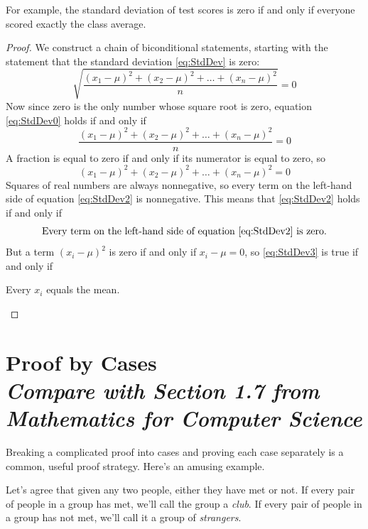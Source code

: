 \documentclass[11pt,oneside]{book}
\theoremstyle{definition}
\begin{document}
For example, the standard deviation of test scores is zero if and only if everyone scored exactly the class average.
\begin{proof}
    We construct a chain of biconditional statements, starting with the statement that the standard deviation \eqref{eq:StdDev} is zero:
    \begin{equation}
        \sqrt{\frac{(x_{1} - \mu)^{2} + (x_{2} - \mu)^{2} + \dots + (x_{n} - \mu)^{2}}{n}} = 0 \label{eq:StdDev0}
    \end{equation}
    Now since zero is the only number whose square root is zero, equation \eqref{eq:StdDev0} holds if and only if
    \begin{equation}
        \frac{(x_{1} - \mu)^{2} + (x_{2} - \mu)^{2} + \dots + (x_{n} - \mu)^{2}}{n} = 0 \label{eq:StdDev1}
    \end{equation}
    A fraction is equal to zero if and only if its numerator is equal to zero, so
    \begin{equation}
        (x_{1} - \mu)^{2} + (x_{2} - \mu)^{2} + \dots + (x_{n} - \mu)^{2} = 0 \label{eq:StdDev2}
    \end{equation}
    Squares of real numbers are always nonnegative, so every term on the left-hand side of equation \eqref{eq:StdDev2} is nonnegative.
    This means that \eqref{eq:StdDev2} holds if and only if
    \begin{equation}
        \text{Every term on the left-hand side of equation \eqref{eq:StdDev2} is zero.} \label{eq:StdDev3}
    \end{equation}
    But a term $(x_{i} - \mu)^{2}$ is zero if and only if $x_{i} - \mu = 0$, so \eqref{eq:StdDev3} is true if and only if
    \begin{center}
        Every $x_{i}$ equals the mean.
    \end{center}
\end{proof}


\section[Proof by Cases]{Proof by Cases\\[0.5ex]
\normalsize\normalfont\textit{
    Compare with Section 1.7 from \emph{Mathematics for Computer Science}
}}\label{sec:ProofByCases}
Breaking a complicated proof into cases and proving each case separately is a common, useful proof strategy.
Here's an amusing example.

Let's agree that given any two people, either they have met or not.
If every pair of people in a group has met, we'll call the group a \emph{club}.
If every pair of people in a group has not met, we'll call it a group of \emph{strangers}.
\end{document}
